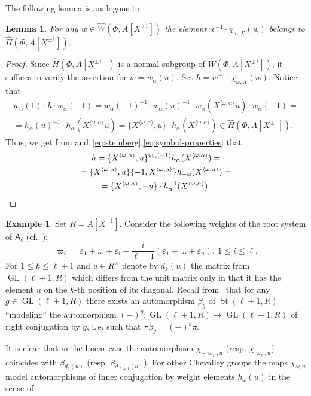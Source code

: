 \documentclass[oneside, 10pt]{amsart}
\DeclareMathOperator{\St}{St}
\DeclareMathOperator{\GL}{GL}
\newcommand{\rA}{\mathsf{A}}
\newcommand{\StW}{\widehat{W}}
\newcommand{\StH}{\widehat{H}}
\numberwithin{equation}{section}
\numberwithin{thm}{section}
\newtheorem{lemma}[thm]{Lemma}
\numberwithin{lemma}{section}
\theoremstyle{definition}
\newtheorem{example}[lemma]{Example}
\theoremstyle{remark}
\begin{document}
The following lemma is analogous to~\cite[Lemma~3.1(c)]{Tu83}.
\begin{lemma} \label{lem:winv-chiw}
For any $w \in \StW(\Phi, A[X^{\pm 1}])$ the element $w^{-1} \cdot \chi_{\omega, X}(w)$ belongs to $\StH(\Phi, A[X^{\pm 1}])$.
\end{lemma}
\begin{proof}
Since $\StH(\Phi, A[X^{\pm 1}])$ is a normal subgroup of $\StW(\Phi, A[X^{\pm 1}])$, it suffices to verify the assertion for $w = w_\alpha(u)$.
Set $h = w^{-1} \cdot \chi_{\omega, X}(w)$.
Notice that
\begin{multline*} w_\alpha(1) \cdot h\cdot  w_\alpha(-1) = w_\alpha(-1)^{-1} \cdot w_\alpha(u)^{-1} \cdot w_{\alpha}(X^{\langle \omega, \alpha \rangle} u) \cdot w_\alpha(-1) = \\
= h_\alpha(u)^{-1} \cdot h_\alpha(X^{ \langle \omega, \alpha \rangle }u) = \{ X^{\langle \omega, \alpha \rangle}, u \} \cdot h_\alpha(X^{\langle \omega, \alpha \rangle}) \in \StH(\Phi, A[X^{\pm 1}]).\end{multline*}
Thus, we get from\cite[Lemme~5.2]{Ma69} and~\eqref{eq:steinberg},\eqref{eq:symbol-properties} that
\begin{multline} \label{eq:w-computation} h = \{ X^{\langle \omega, \alpha \rangle}, u \}{}^{w_\alpha(-1)}h_\alpha(X^{\langle \omega, \alpha \rangle}) = \\
= \{ X^{\langle \omega, \alpha \rangle}, u \} \{ -1, X^{\langle \omega, \alpha \rangle} \} h_{-\alpha}(X^{\langle \omega, \alpha \rangle}) = \\
= \{ X^{\langle \omega, \alpha \rangle}, -u \} \cdot h_\alpha^{-1}(X^{\langle \omega, \alpha \rangle}).\qedhere\end{multline}
\end{proof}

\begin{example} \label{exm:chi-linear}
Set $R = A[X^{\pm 1}]$.
Consider the following weights of the root system of $\rA_\ell$ (cf.~\cite[\S~VI.4.7]{Bou}):
\[ \varpi_{i} = \varepsilon_1 + \ldots + \varepsilon_i - \frac{i}{\ell+1}(\varepsilon_1 + \ldots + \varepsilon_n), \ 1 \leq i \leq \ell. \]
For $1\leq k\leq \ell+1$ and $u \in R^\times$ denote by $d_k(u)$ the matrix from $\GL(\ell+1, R)$ which differs from the unit matrix only in that it has the element $u$ on the $k$-th position of its diagonal.
Recall from~\cite[Corollary~4]{Ka77} that for any $g \in \GL(\ell+1, R)$ there exists an automorphism $\beta_g$ of $\St(\ell+1, R)$ ``modeling'' the automorphism $(-)^g \colon \GL(\ell+1, R) \to \GL(\ell+1, R)$ of right conjugation by $g$, i.\,e. such that $\pi \beta_g = (-)^g \pi$.


It is clear that in the linear case the automorphism $\chi_{-\varpi_1, u}$ (resp. $\chi_{\varpi_{\ell}, u}$) coincides with $\beta_{d_1(u)}$ (resp. $\beta_{d_{\ell+1}(u)}$).
For other Chevalley groups the maps $\chi_{\omega, u}$ model automorphisms of inner conjugation by weight elements $h_\omega(u)$ in the sense of~\cite[\S~4]{Vav09}.
\end{example}
\end{document}

